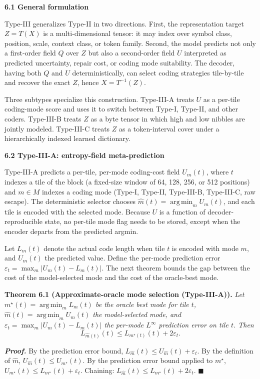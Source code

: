\documentclass[
]{article}
\begin{document}
\textbf{6.1 General formulation}

Type-III generalizes Type-II in two directions. First, the
representation target $Z = T(X)$ is a multi-dimensional tensor: it may
index over symbol class, position, scale, context class, or token
family. Second, the model predicts not only a first-order field $Q$
over $Z$ but also a second-order field $U$ interpreted as predicted
uncertainty, repair cost, or coding mode suitability. The decoder,
having both $Q$ and $U$ deterministically, can select coding
strategies tile-by-tile and recover the exact $Z$, hence
$X = T^{-1}(Z)$.

Three subtypes specialize this construction. Type-III-A treats $U$ as
a per-tile coding-mode score and uses it to switch between Type-I,
Type-II, and other coders. Type-III-B treats $Z$ as a byte tensor in
which high and low nibbles are jointly modeled. Type-III-C treats $Z$
as a token-interval cover under a hierarchically indexed learned
dictionary.

\textbf{6.2 Type-III-A: entropy-field meta-prediction}

Type-III-A predicts a per-tile, per-mode coding-cost field $U_m(t)$,
where $t$ indexes a tile of the block (a fixed-size window of 64,
128, 256, or 512 positions) and $m \in M$ indexes a coding mode
(Type-I, Type-II, Type-III-B, Type-III-C, raw escape). The
deterministic selector chooses
$\hat{m}(t) = \operatorname*{arg\,min}_m U_m(t)$, and each tile is
encoded with the selected mode. Because $U$ is a function of
decoder-reproducible state, no per-tile mode flag needs to be stored,
except when the encoder departs from the predicted argmin.

Let $L_m(t)$ denote the actual code length when tile $t$ is encoded
with mode $m$, and $U_m(t)$ the predicted value. Define the per-mode
prediction error $\varepsilon_t = \max_m |U_m(t) - L_m(t)|$. The next
theorem bounds the gap between the cost of the model-selected mode
and the cost of the oracle-best mode.

\textbf{Theorem 6.1 (Approximate-oracle mode selection (Type-III-A)).}
\emph{Let $m^\star(t) = \operatorname*{arg\,min}_m L_m(t)$ be the
oracle best mode for tile $t$,
$\hat{m}(t) = \operatorname*{arg\,min}_m U_m(t)$ the model-selected
mode, and $\varepsilon_t = \max_m |U_m(t) - L_m(t)|$ the per-mode
$L^\infty$ prediction error on tile $t$. Then}
\[
L_{\hat{m}(t)}(t) \leq L_{m^\star(t)}(t) + 2\varepsilon_t.
\tag{6.1}
\]

\emph{\textbf{Proof.}} By the prediction error bound,
$L_{\hat{m}}(t) \leq U_{\hat{m}}(t) + \varepsilon_t$. By the
definition of $\hat{m}$, $U_{\hat{m}}(t) \leq U_{m^\star}(t)$. By the
prediction error bound applied to $m^\star$,
$U_{m^\star}(t) \leq L_{m^\star}(t) + \varepsilon_t$. Chaining:
$L_{\hat{m}}(t) \leq L_{m^\star}(t) + 2\varepsilon_t$.
\hfill$\blacksquare$
\end{document}
